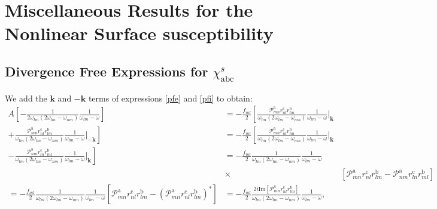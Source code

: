 \chapter{Miscellaneous Results for the Nonlinear Surface susceptibility}
\partialtoc



\section{Divergence Free Expressions for $\chi^s_{\mathrm{a}\mathrm{b}\mathrm{c}}$}

We add the $\mathbf{k}$ and $-\mathbf{k}$ terms of expressions \eqref{pfe} and
\eqref{pfi} to obtain:
\begin{align}\label{chi1}
A
\left[
-\frac{1}{2\omega_{lm}(2\omega_{lm}-\omega_{nm})}\frac{1}{\omega_{lm}-\omega}
\right]&=-\frac{f_{ml}}{2}
\left[
\frac{\mathcal{P}^{\mathrm{a}}_{mn}r^{\mathrm{c}}_{nl}r^{\mathrm{b}}_{lm}}{\omega_{lm}(2\omega_{lm}-\omega_{nm})}\frac{1}{\omega_{lm}-\omega}|_{\mathbf{k}}
\right.
\nonumber\\
+
\left.
\frac{\mathcal{P}^{\mathrm{a}}_{mn}r^{\mathrm{c}}_{nl}r^{\mathrm{b}}_{lm}}{\omega_{lm}(2\omega_{lm}-\omega_{nm})}\frac{1}{\omega_{lm}-\omega}|_{-\mathbf{k}}
\right]
&=-\frac{f_{ml}}{2}
\left[
\frac{\mathcal{P}^{\mathrm{a}}_{mn}r^{\mathrm{c}}_{nl}r^{\mathrm{b}}_{lm}}{\omega_{lm}(2\omega_{lm}-\omega_{nm})}\frac{1}{\omega_{lm}-\omega}|_{\mathbf{k}}
\right.
\nonumber\\
-
\left.
\frac{\mathcal{P}^{\mathrm{a}}_{nm}r^{\mathrm{c}}_{ln}r^{\mathrm{b}}_{ml}}{\omega_{lm}(2\omega_{lm}-\omega_{nm})}\frac{1}{\omega_{lm}-\omega}|_{\mathbf{k}}
\right]
&=-\frac{f_{ml}}{2}
\frac{1}{\omega_{lm}(2\omega_{lm}-\omega_{nm})}\frac{1}{\omega_{lm}-\omega}
\nonumber\\
&\times&
\left[
\mathcal{P}^{\mathrm{a}}_{mn}r^{\mathrm{c}}_{nl}r^{\mathrm{b}}_{lm}
-
\mathcal{P}^{\mathrm{a}}_{nm}r^{\mathrm{c}}_{ln}r^{\mathrm{b}}_{ml}
\right]
\\
=-\frac{f_{ml}}{2}
\frac{1}{\omega_{lm}(2\omega_{lm}-\omega_{nm})}\frac{1}{\omega_{lm}-\omega}
\left[
\mathcal{P}^{\mathrm{a}}_{mn}r^{\mathrm{c}}_{nl}r^{\mathrm{b}}_{lm}
-
(\mathcal{P}^{\mathrm{a}}_{mn}r^{\mathrm{c}}_{nl}r^{\mathrm{b}}_{lm})^*
\right]
&=-\frac{f_{ml}}{2}
\frac{2i\mathrm{Im}[\mathcal{P}^{\mathrm{a}}_{mn}r^{\mathrm{c}}_{nl}r^{\mathrm{b}}_{lm}]}{\omega_{lm}(2\omega_{lm}-\omega_{nm})}\frac{1}{\omega_{lm}-\omega}
\nonumber
,
\end{align}
